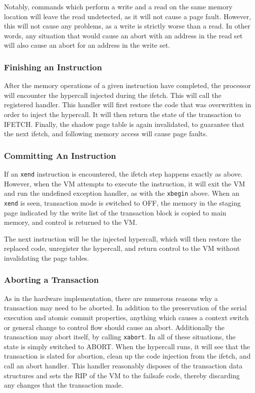 \documentclass{acm_proc_article-sp}
\begin{document}
Notably, commands which perform a write and a read on the same memory location
will leave the read undetected, as it will not cause a page fault. However,
this will not cause any problems, as a write is strictly worse than a read. In
other words, any situation that would cause an abort with an address in the 
read set will also cause an abort for an address in the write set.

\subsubsection{Finishing an Instruction}

After the memory operations of a given instruction have completed, the 
processor will encounter the hypercall injected during the ifetch. This will
call the registered handler. This handler will first restore the code that
was overwritten in order to inject the hypercall. It will then return the state
of the transaction to IFETCH. Finally, the shadow page table is again 
invalidated, to guarantee that the next ifetch, and following memory access 
will cause page faults.  

\subsubsection{Committing An Instruction}

If an \texttt{xend} instruction is encountered, the ifetch step happens exactly as above.
However, when the VM attempts to execute the instruction, it will exit the VM
and run the undefined exception handler, as with the \texttt{xbegin} above. When an \texttt{xend}
is seen, transaction mode is switched to OFF, the memory in the staging page
indicated by the write list of the transaction block is
copied to main memory, and control is returned to the VM.

The next instruction will be the injected hypercall, which will then restore the
replaced code, unregister the hypercall, and return control to the VM without
invalidating the page tables.

\subsubsection{Aborting a Transaction}

As in the hardware implementation, there are numerous reasons why a transaction
may need to be aborted. In addition to the preservation of the serial execution
and atomic commit properties, anything which causes a context switch or general
change to control flow should cause an abort. Additionally the transaction may
abort itself, by calling \texttt{xabort}. In all of these situations, the state is 
simply switched to ABORT. When the hypercall runs, it will see that the 
transaction is slated for abortion, clean up the code injection from the ifetch,
and call an abort handler. This handler reasonably disposes of the transaction
data structures and sets the RIP of the VM to the failsafe code, thereby
discarding any changes that the transaction made. 
\end{document}

